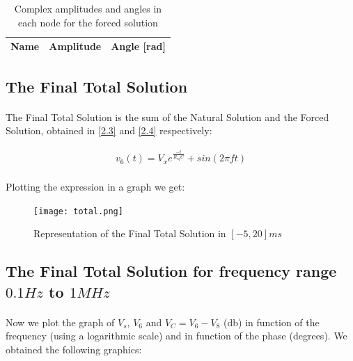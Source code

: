\begin{table}[h]
  \centering
  \begin{tabular}{|l|l|l|}
    \hline
    {\bf Name} & {\bf Amplitude } & {\bf Angle [rad]} \\ \hline
    
  \end{tabular}
  \caption{Complex amplitudes and angles in each node for the forced solution}
  \label{tab:analise4}
\end{table}



\subsection{The Final Total Solution} \label{2.5}

\paragraph{} The Final Total Solution is the sum of the Natural Solution and the Forced Solution,
obtained in \ref{2.3} and \ref{2.4} respectively:


\begin{center}
  \begin{gather*}
    v_{6}(t)= V_x e^\frac{-t}{R_{eq}C}+sin(2\pi f t)
  \end{gather*}
\end{center}

\paragraph{} Plotting the expression in a graph we get:


\begin{figure}[h]
  \centering
  \texttt{[image: total.png]}
  \caption{Representation of the Final Total Solution in $[-5,20]ms$}
\end{figure}




\subsection{The Final Total Solution for frequency range $0.1Hz$ to $1MHz$} \label{2.6}

\paragraph{} Now we plot the graph of $V_s$, $V_6$ and $V_C = V_6 - V_8$ (db) in function of the
frequency (using a logarithmic scale) and in function of the phase (degrees). We obtained the following
graphics:

